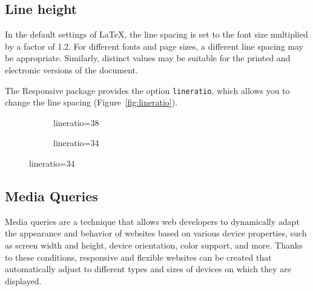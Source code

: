 \documentclass{ltxdoc}
\newcommand\printsize[1]{\csname #1\endcsname\par\noindent Sample\par}
\newcommand\showscale[2][.5\textwidth]{%
  \noindent\fbox{%
    \begin{minipage}{#1}
      \ResponsiveSetup{#2}
      \setsizes[34]{25}
      \printsize{huge}
      \printsize{LARGE}
      \printsize{Large}
      \printsize{large}
      \hrule
      \printsize{normalsize}
      \hrule
      \printsize{small}
      \printsize{footnotesize}
    \end{minipage}
  }
    \ifx\relax#2\relax Default parameters\else\texttt{#2}\fi\hfill\null
}
\begin{document}

\subsection{Line height}

In the default settings of \LaTeX, the line spacing is set to the font size
multiplied by a factor of 1.2. For different fonts and page sizes, a different
line spacing may be appropriate. Similarly, distinct values may be suitable for
the printed and electronic versions of the document. 

The Responsive package provides the option \verb|lineratio|, which allows you to change the line spacing
(Figure~\ref{fig:lineratio}).

\begin{figure}[htbp]
  \caption{Changing the line spacing by adjusting the value of \texttt{lineratio}.}\label{fig:lineratio}
  \begin{subfigure}[b]{0.45\textwidth}
\caption{lineratio=38}
\end{subfigure}
\begin{subfigure}[b]{0.45\textwidth}
\caption{lineratio=34}
\end{subfigure}
\end{figure}


\subsection{Media Queries}

Media queries are a technique that allows web developers to dynamically adapt
the appearance and behavior of websites based on various device properties,
such as screen width and height, device orientation, color support, and more.
Thanks to these conditions, responsive and flexible websites can be created
that automatically adjust to different types and sizes of devices on which they
are displayed.
\end{document}
